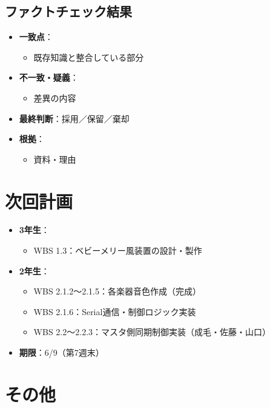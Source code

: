 \documentclass[a4paper,12pt]{ltjsarticle}
\begin{document}
\subsection{ファクトチェック結果}
\begin{itemize}
  \item \textbf{一致点}：
    \begin{itemize}
      \item 既存知識と整合している部分
    \end{itemize}
  \item \textbf{不一致・疑義}：
    \begin{itemize}
      \item 差異の内容
    \end{itemize}
  \item \textbf{最終判断}：採用／保留／棄却
  \item \textbf{根拠}：
    \begin{itemize}
      \item 資料・理由
    \end{itemize}
\end{itemize}

\section{次回計画}

\begin{itemize}
  \item \textbf{3年生}：
    \begin{itemize}
      \item WBS 1.3：ベビーメリー風装置の設計・製作
    \end{itemize}
  \item \textbf{2年生}：
    \begin{itemize}
      \item WBS 2.1.2〜2.1.5：各楽器音色作成（完成）
      \item WBS 2.1.6：Serial通信・制御ロジック実装
      \item WBS 2.2〜2.2.3：マスタ側同期制御実装（成毛・佐藤・山口）
    \end{itemize}
  \item \textbf{期限}：6/9（第7週末）
\end{itemize}

\section{その他}
\end{document}
